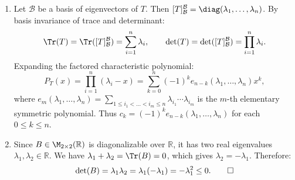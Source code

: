 \begin{exercisesolution}
\label{sol:trace_determinant_char_poly_diagonalizable}
\begin{enumerate}[label=\textbf{(\alph*)}]
    \item Let $\mathcal{B}$ be a basis of eigenvectors of $T$. Then $[T]_\mathcal{B}^\mathcal{B} = \diag(\lambda_1, \dots, \lambda_n)$.
    By basis invariance of trace and determinant:
    \[
    \Tr(T) = \Tr([T]_\mathcal{B}^\mathcal{B}) = \sum_{i=1}^n \lambda_i, \qquad \det(T) = \det([T]_\mathcal{B}^\mathcal{B}) = \prod_{i=1}^n \lambda_i.
    \]
    Expanding the factored characteristic polynomial:
    \[
    P_T(x) = \prod_{i=1}^n (\lambda_i - x) = \sum_{k=0}^n (-1)^k e_{n-k}(\lambda_1, \dots, \lambda_n) x^k,
    \]
    where $e_m(\lambda_1, \dots, \lambda_n) = \sum_{1 \le i_1 < \dots < i_m \le n} \lambda_{i_1} \cdots \lambda_{i_m}$ is the $m$-th elementary symmetric polynomial.
    Thus $c_k = (-1)^k e_{n-k}(\lambda_1, \dots, \lambda_n)$ for each $0 \le k \le n$.

    \item Since $B \in \M_{2 \times 2}(\mathbb{R})$ is diagonalizable over $\mathbb{R}$, it has two real eigenvalues $\lambda_1, \lambda_2 \in \mathbb{R}$.
    We have $\lambda_1 + \lambda_2 = \Tr(B) = 0$, which gives $\lambda_2 = -\lambda_1$.
    Therefore:
    \[
    \det(B) = \lambda_1 \lambda_2 = \lambda_1(-\lambda_1) = -\lambda_1^2 \le 0. \qedhere
    \]
\end{enumerate}
\end{exercisesolution}

